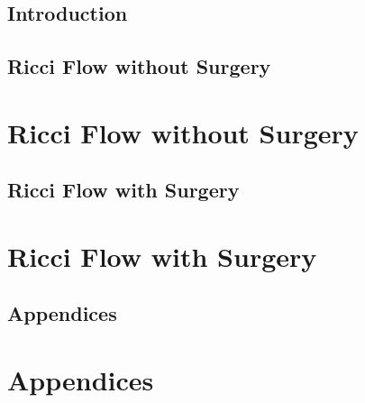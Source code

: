 

\chapter{Introduction}

\chapter{Ricci Flow without Surgery}
\part{Ricci Flow without Surgery}
\label{part:kl-without-surgery}

\chapter{Ricci Flow with Surgery}
\part{Ricci Flow with Surgery}
\label{part:kl-with-surgery}

\chapter{Appendices}
\appendix
\part*{Appendices}

